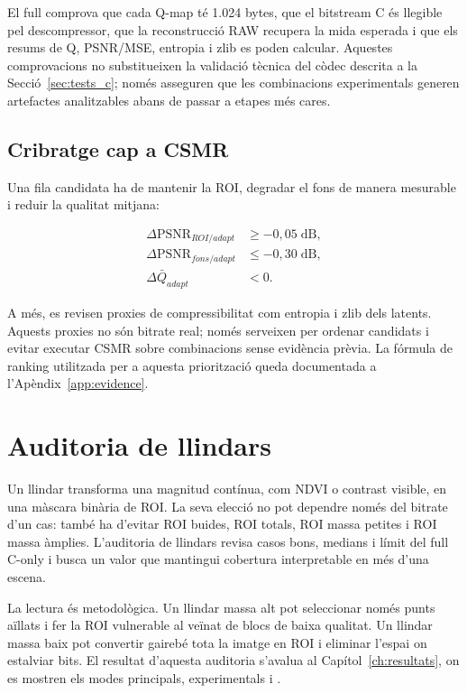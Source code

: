 El full comprova que cada Q-map té 1.024 bytes, que el bitstream C és llegible
pel descompressor, que la reconstrucció RAW recupera la mida esperada i que els
resums de Q, PSNR/MSE, entropia i zlib es poden calcular. Aquestes comprovacions
no substitueixen la validació tècnica del còdec descrita a la
Secció~\ref{sec:tests_c}; només asseguren que les combinacions experimentals
generen artefactes analitzables abans de passar a etapes més cares.

\subsection{Cribratge cap a CSMR}

Una fila candidata ha de mantenir la ROI, degradar el fons de manera mesurable i
reduir la qualitat mitjana:

\begin{align}
\Delta\mathrm{PSNR}_{ROI/adapt}&\geq-0,05\;\mathrm{dB},\\
\Delta\mathrm{PSNR}_{fons/adapt}&\leq-0,30\;\mathrm{dB},\\
\Delta\bar Q_{adapt}&<0.
\end{align}

A més, es revisen proxies de compressibilitat com entropia i zlib dels latents.
Aquests proxies no són bitrate real; només serveixen per ordenar candidats i
evitar executar CSMR sobre combinacions sense evidència prèvia. La fórmula de
ranking utilitzada per a aquesta priorització queda documentada a
l'Apèndix~\ref{app:evidence}.

\section{Auditoria de llindars}\label{sec:llindar_method}

Un llindar transforma una magnitud contínua, com NDVI o contrast visible, en una
màscara binària de ROI. La seva elecció no pot dependre només del bitrate d'un
cas: també ha d'evitar ROI buides, ROI totals, ROI massa petites i ROI massa
àmplies. L'auditoria de llindars revisa casos bons, medians i límit del full
C-only i busca un valor que mantingui cobertura interpretable en més d'una
escena.

La lectura és metodològica. Un llindar massa alt pot seleccionar només punts
aïllats i fer la ROI vulnerable al veïnat de blocs de baixa qualitat. Un llindar
massa baix pot convertir gairebé tota la imatge en ROI i eliminar l'espai on
estalviar bits. El resultat d'aquesta auditoria s'avalua al
Capítol~\ref{ch:resultats}, on es mostren els modes principals, experimentals i
.

